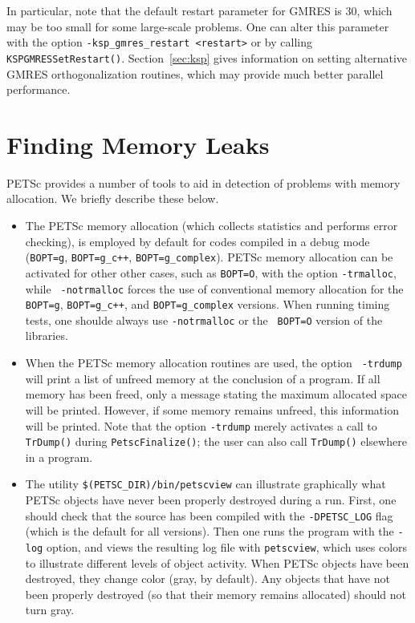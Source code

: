 In particular, note that the default restart parameter for GMRES is
30, which may be too small for some large-scale problems.  One can alter this
parameter with the option {\tt -ksp\_gmres\_restart <restart>} or by
calling {\tt KSPGMRESSetRestart()}. Section~\ref{sec:ksp} gives
information on setting alternative GMRES orthogonalization routines,
which may provide much better parallel performance.

\section{Finding Memory Leaks}

PETSc provides a number of tools to aid in detection of problems
with memory allocation.  We briefly describe these below.

\begin{itemize}
\item The PETSc memory allocation (which collects statistics and performs
error checking), is employed by default for codes compiled in a
debug mode ({\tt BOPT=g}, {\tt BOPT=g\_c++}, {\tt BOPT=g\_complex}).
PETSc memory allocation can be activated for other other cases, such
as {\tt BOPT=O}, with the option {\tt -trmalloc}, while {\tt
-notrmalloc} forces the use of conventional memory allocation for the
{\tt BOPT=g}, {\tt BOPT=g\_c++}, and {\tt BOPT=g\_complex} versions.
When running timing tests, one shoulde always use {\tt -notrmalloc} or the {\tt
BOPT=O} version of the libraries.

\item When the PETSc memory allocation routines are used, the option {\tt
-trdump} will print a list of unfreed memory at the conclusion of a
program.  If all memory has been freed, only a message stating
the maximum allocated space will be printed.  However, if some memory
remains unfreed, this information will be printed.  Note that the
option {\tt -trdump} merely activates a call to {\tt TrDump()} during
{\tt PetscFinalize()}; the user can also call {\tt TrDump()} elsewhere
in a program.

\item The utility {\tt \$(PETSC\_DIR)/bin/petscview} can illustrate graphically
what PETSc objects have never been properly destroyed during a run.  
First, one should check that the source has been compiled with the
      {\tt -DPETSC\_LOG} flag (which is the default for all versions).
Then one runs the program with the {\tt -log} option, and views the resulting
      log file with {\tt petscview}, which uses colors to illustrate different
      levels of object activity.  When PETSc objects have been destroyed,
      they change color (gray, by default).  Any objects that have not
      been properly destroyed (so that their memory remains allocated)
      should not turn gray.
\end{itemize}

